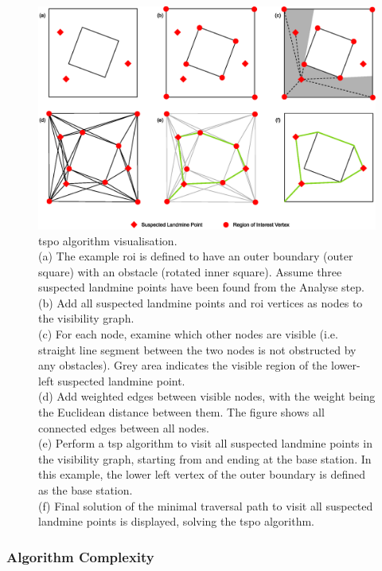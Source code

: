 \begin{figure}[h]
    \centering
    \includegraphics[width=\linewidth]{figs/Jihwan/TSPO Algorithm Visualisation.eps}
    \caption[\gls{tspo} Algorithm Visualisation]
    {\gls{tspo} algorithm visualisation. \\
    (a) The example \gls{roi} is defined to have an outer boundary (outer square) with an obstacle (rotated inner square). Assume three suspected landmine points have been found from the Analyse step. \\
    (b) Add all suspected landmine points and \gls{roi} vertices as nodes to the visibility graph. \\
    (c) For each node, examine which other nodes are visible (i.e. straight line segment between the two nodes is not obstructed by any obstacles). Grey area indicates the visible region of the lower-left suspected landmine point. \\ 
    (d) Add weighted edges between visible nodes, with the weight being the Euclidean distance between them. The figure shows all connected edges between all nodes. \\
    (e) Perform a \gls{tsp} algorithm to visit all suspected landmine points in the visibility graph, starting from and ending at the base station. In this example, the lower left vertex of the outer boundary is defined as the base station. \\
    (f) Final solution of the minimal traversal path to visit all suspected landmine points is displayed, solving the \gls{tspo} algorithm. 
    }
    \label{fig:msp_tspo}
\end{figure}

\subsubsection{Algorithm Complexity}


